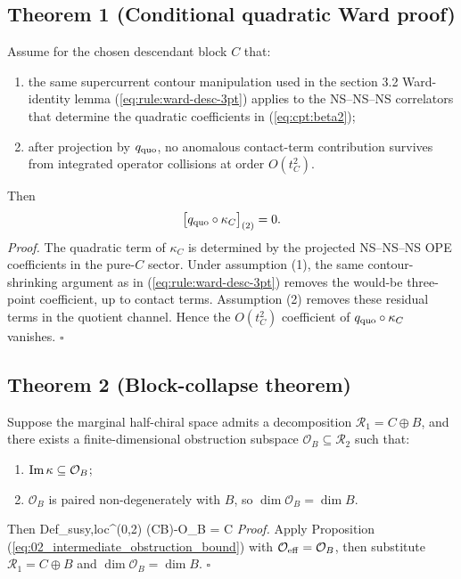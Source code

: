 \documentclass[12pt]{article}
\begin{document}
		\subsection*{Theorem 1 (Conditional quadratic Ward proof)}
		Assume for the chosen descendant block $C$ that:
		\begin{enumerate}
		\item the same supercurrent contour manipulation used in the section 3.2 Ward-identity lemma (\ref{eq:rule:ward-desc-3pt}) applies to the NS--NS--NS correlators that determine the quadratic coefficients in (\ref{eq:cpt:beta2});
		\item after projection by $q_{\rm quo}$, no anomalous contact-term contribution survives from integrated operator collisions at order $O(t_C^2)$.
		\end{enumerate}
		Then
		\[
		\big[q_{\rm quo}\circ\kappa_C\big]_{(2)}=0.
		\]
		\textit{Proof.}
		The quadratic term of $\kappa_C$ is determined by the projected NS--NS--NS OPE coefficients in the pure-$C$ sector. Under assumption (1), the same contour-shrinking argument as in (\ref{eq:rule:ward-desc-3pt}) removes the would-be three-point coefficient, up to contact terms. Assumption (2) removes these residual terms in the quotient channel. Hence the $O(t_C^2)$ coefficient of $q_{\rm quo}\circ\kappa_C$ vanishes. \hfill$\square$
		
		\subsection*{Theorem 2 (Block-collapse theorem)}
		Suppose the marginal half-chiral space admits a decomposition $\mathcal R_1=C\oplus B$, and there exists a finite-dimensional obstruction subspace $\mathcal O_B\subseteq\mathcal R_2$ such that:
		\begin{enumerate}
		\item $\textnormal{Im}\,\kappa\subseteq\mathcal O_B$;
		\item $\mathcal O_B$ is paired non-degenerately with $B$, so $\dim\mathcal O_B=\dim B$.
		\end{enumerate}
		Then
		\ie\label{eq:02_structural_bound}
		\dim \textnormal{Def}_{\rm susy,loc}^{(0,2)}
		\;\ge\;
		\dim(C\oplus B)-\dim\mathcal O_B
		\;=\;
		\dim C
		\fe
		\textit{Proof.}
		Apply Proposition (\ref{eq:02_intermediate_obstruction_bound}) with $\mathcal O_{\rm eff}=\mathcal O_B$, then substitute $\mathcal R_1=C\oplus B$ and $\dim\mathcal O_B=\dim B$. \hfill$\square$
		
\end{document}
